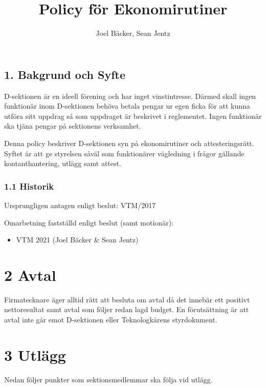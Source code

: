 \documentclass[]{dsekkallelse}
\title{Policy för Ekonomirutiner}
\author{Joel Bäcker, Sean Jentz}
\begin{document}
\subsection{1. Bakgrund och Syfte}
D-sektionen är en ideell förening och har inget vinstintresse. Därmed skall ingen funktionär inom D-sektionen behöva betala pengar ur egen ficka för att kunna utföra sitt uppdrag så som uppdraget är beskrivet i reglementet. Ingen funktionär ska tjäna pengar på sektionens verksamhet.

\par Denna policy beskriver D-sektionen syn på ekonomirutiner och attesteringsrätt. Syftet är att ge styrelsen såväl som funktionärer vägledning i frågor gällande kontanthantering, utlägg samt attest.

\subsubsection{1.1 Historik}
Ursprungligen antagen enligt beslut: VTM/2017

Omarbetning fastställd enligt beslut (samt motionär):
\begin{itemize}
    \item VTM 2021 (Joel Bäcker \& Sean Jentz)
\end{itemize}





\section{2 Avtal}
Firmatecknare äger alltid rätt att besluta om avtal då det innebär ett
positivt nettoresultat samt avtal som följer redan lagd budget. En förutsättning är att avtal
inte går emot D-sektionen eller Teknologkårens styrdokument.

\section{3 Utlägg}
Nedan följer punkter som sektionsmedlemmar ska följa vid utlägg.
\end{document}
